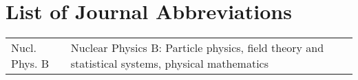 
\chapter*{List of Journal Abbreviations}
\begin{center}
\begin{tabular}{lp{}}
  Nucl. Phys. B \dotfill & Nuclear Physics B: Particle physics, field
  theory and statistical systems, physical mathematics \\
\end{tabular}
\end{center}
